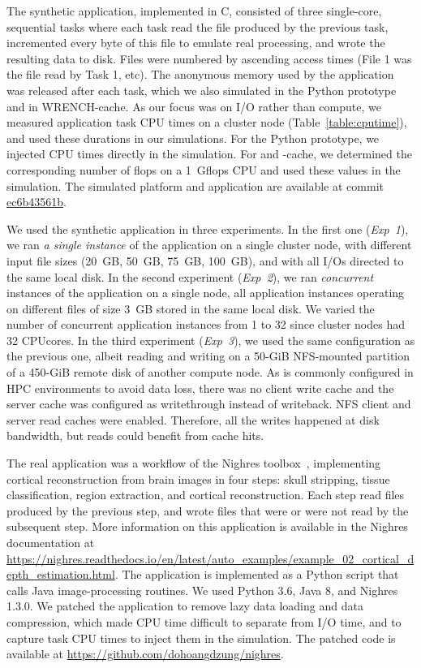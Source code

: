 The synthetic application, implemented in C, consisted of three single-core,
sequential tasks where each task read the file produced by the previous task, 
incremented every byte of this file to emulate real processing, 
and wrote the resulting data to disk. 
Files were numbered by ascending access times (File 1 was the file read by Task 1, etc).
The anonymous memory used by the application was released after each task, 
which we also simulated in the Python prototype and in WRENCH-cache. 
As our focus was on I/O rather than compute, we measured application task 
CPU times on a cluster node (Table~\ref{table:cputime}), and used these durations 
in our simulations. 
For the Python prototype, we injected CPU times directly in the simulation. 
For \wrench and \wrench-cache, we determined the corresponding number 
of flops on a 1~Gflops CPU and used these values in the simulation. 
The simulated platform and application are available at commit 
\href{https://github.com/wrench-project/wrench/tree/ec6b43561b95977002258c0fe37a4ecad8f1d33f/examples/basic-examples/io-pagecache}{ec6b43561b}.

We used the synthetic application in three experiments. In the first one 
(\textit{Exp~1}), we ran \emph{a single instance} of the application on a 
single cluster node, with different input file sizes (20~GB, 50~GB, 75~GB, 100~GB), 
and with all I/Os directed to the same local disk.
In the second experiment (\textit{Exp~2}), we ran \emph{concurrent} instances 
of the application on a single node, all application instances operating on 
different files of size 3~GB stored in the same local disk. 
We varied the number of concurrent application instances from 1 to 32 
since cluster nodes had 32 CPUcores.
In the third experiment (\textit{Exp~3}), we used the same configuration as 
the previous one, albeit reading and writing on a 50-GiB NFS-mounted 
partition of a 450-GiB remote disk of another compute node. 
As is commonly configured in HPC environments to avoid data loss, 
there was no client write cache and the server cache was configured as 
writethrough instead of writeback. 
NFS client and server read caches were enabled. Therefore, all the writes happened 
at disk bandwidth, but reads could benefit from cache hits.

The real application was a workflow of the Nighres 
toolbox~\cite{huntenburg2018nighres}, implementing cortical reconstruction 
from brain images in four steps: skull stripping, tissue classification, 
region extraction, and cortical reconstruction. 
Each step read files produced by the previous step, and wrote files that 
were or were not read by the subsequent step.
More information on this application is available in the Nighres
documentation at
\url{https://nighres.readthedocs.io/en/latest/auto_examples/example_02_cortical_depth_estimation.html}.
The application is implemented as a Python script that calls Java
image-processing routines. We used Python 3.6, Java 8, and Nighres 1.3.0. 
We patched the application to remove lazy data loading and data compression, 
which made CPU time difficult to separate from I/O time, and to capture task 
CPU times to inject them in the simulation. 
The patched code is available at \url{https://github.com/dohoangdzung/nighres}.

